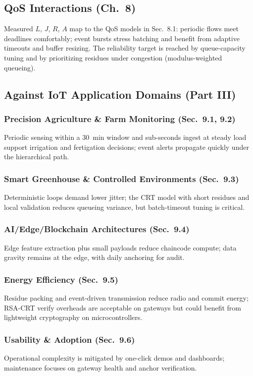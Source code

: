 \subsection{QoS Interactions (Ch.~8)}
Measured $L$, $J$, $R$, $A$ map to the QoS models in Sec.~8.1: periodic flows meet deadlines comfortably; event bursts stress batching and benefit from adaptive timeouts and buffer resizing. The reliability target is reached by queue-capacity tuning and by prioritizing residues under congestion (modulus-weighted queueing).

\subsection{Against IoT Application Domains (Part III)}
\subsubsection{Precision Agriculture \& Farm Monitoring (Sec.~9.1, 9.2)}
Periodic sensing within a 30~min window and sub-seconds ingest at steady load support irrigation and fertigation decisions; event alerts propagate quickly under the hierarchical path.

\subsubsection{Smart Greenhouse \& Controlled Environments (Sec.~9.3)}
Deterministic loops demand lower jitter; the CRT model with short residues and local validation reduces queueing variance, but batch-timeout tuning is critical.

\subsubsection{AI/Edge/Blockchain Architectures (Sec.~9.4)}
Edge feature extraction plus small payloads reduce chaincode compute; data gravity remains at the edge, with daily anchoring for audit.

\subsubsection{Energy Efficiency (Sec.~9.5)}
Residue packing and event-driven transmission reduce radio and commit energy; RSA-CRT verify overheads are acceptable on gateways but could benefit from lightweight cryptography on microcontrollers.

\subsubsection{Usability \& Adoption (Sec.~9.6)}
Operational complexity is mitigated by one-click demos and dashboards; maintenance focuses on gateway health and anchor verification.

